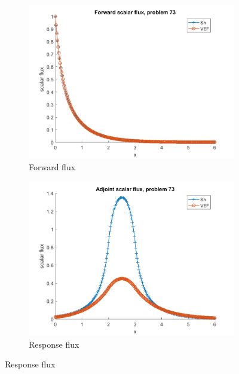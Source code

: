 \documentclass{article}
\begin{document}
\begin{figure}[H]
\label{Case73Flux}
\centering
\begin{subfigure}{.5\textwidth}
  \centering
  \includegraphics[width=.98\linewidth]{IanProposal/figures2/73phi.png}
  \caption{Forward flux}
  \label{fig:sfig1}
\end{subfigure}%
\begin{subfigure}{.5\textwidth}
  \centering
  \includegraphics[width=.98\linewidth]{IanProposal/figures2/73phia.png}
  \caption{Response flux}
  \label{fig:sfig4}
\end{subfigure}%
\end{figure}
\end{document}
